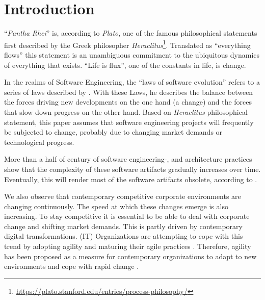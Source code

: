 \chapter{Introduction} \label{introduction} 

\enquote{\emph{Pantha Rhei}} is, according to \emph{Plato}, one of the famous
philosophical statements first described by the Greek philosopher
\emph{Heraclitus}\footnote{\url{https://plato.stanford.edu/entries/process-philosophy/}}.
Translated as \enquote{everything flows} this statement is an unambiguous commitment to
the ubiquitous dynamics of everything that exists. \enquote{Life is flux}, one of the
constants in life, is change.

In the realms of Software Engineering, the \enquote{laws of software evolution}
\parencite[]{lehman_programs_1980} refers to a series of laws described by
\citeauthor{lehman_programs_1980}. With these Laws, he describes the balance between the
forces driving new developments on the one hand (a change) and the forces that slow down
progress on the other hand. Based on \emph{Heraclitus} philosophical statement, this paper
assumes that software engineering projects will frequently be subjected to change,
probably due to changing market demands or technological progress. 

More than a half of century of software engineering-, and architecture practices show that
the complexity of these software artifacts gradually increases over time. Eventually, this
will render most of the software artifacts obsolete, according to
\citeauthor{lehman_programs_1980} \parencite[]{lehman_programs_1980}.

We also observe that contemporary competitive corporate environments are changing
continuously. The speed at which these changes emerge is also increasing. To stay
competitive it is essential to be able to deal with corporate change and shifting market
demands. This is partly driven by
contemporary digital transformations. (IT) Organizations are attempting to cope with this
trend by adopting agility and maturing their agile practices
\parencite[]{2024_SIM_key_issues_and_trends}. Therefore, agility has been proposed as a
measure for contemporary organizations to adapt to new environments and cope with rapid
change \parencite[]{neumann_strategic_1994}.

